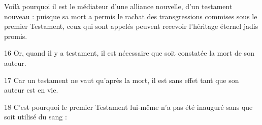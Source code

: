 Voilà pourquoi il est le médiateur d’une alliance nouvelle, d’un testament nouveau : puisque sa mort a permis le rachat des transgressions commises sous le premier Testament, ceux qui sont appelés peuvent recevoir l’héritage éternel jadis promis.

16 Or, quand il y a testament, il est nécessaire que soit constatée la mort de son auteur.

17 Car un testament ne vaut qu’après la mort, il est sans effet tant que son auteur est en vie.

18 C’est pourquoi le premier Testament lui-même n’a pas été inauguré sans que soit utilisé du sang :